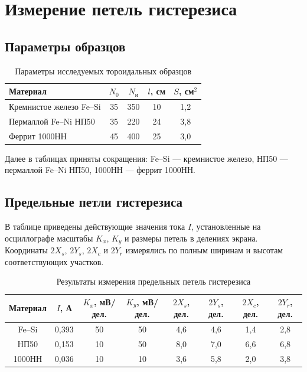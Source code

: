 \documentclass[12pt,a4paper]{article}
\begin{document}
\section{Измерение петель гистерезиса}

\subsection{Параметры образцов}
\begin{table}[H]
  \centering
  \caption{Параметры исследуемых тороидальных образцов}
  \label{tab:samples}
  \begin{tabular}{l c c c c}
    \toprule
    Материал & $N_0$ & $N_{\text{и}}$ & $l$, см & $S$, см$^2$ \\
    \midrule
    Кремнистое железо Fe--Si & 35 & 350 & 10 & 1,2 \\
    Пермаллой Fe--Ni НП50 & 35 & 220 & 24 & 3,8 \\
    Феррит 1000НН & 45 & 400 & 25 & 3,0 \\
    \bottomrule
  \end{tabular}
\end{table}

Далее в таблицах приняты сокращения: Fe--Si --- кремнистое железо,
НП50 --- пермаллой Fe--Ni НП50, 1000НН --- феррит 1000НН.

\subsection{Предельные петли гистерезиса}

В таблице приведены действующие значения тока $I$,
установленные на осциллографе масштабы $K_x$, $K_y$
и размеры петель в делениях экрана. Координаты
$2X_s$, $2Y_s$, $2X_c$ и $2Y_r$ измерялись по полным
ширинам и высотам соответствующих участков.

\begin{table}[H]
    \centering
    \caption{Результаты измерения предельных петель гистерезиса}
    \label{tab:hysteresis}
    \scriptsize
    \setlength{\tabcolsep}{3.1pt}
    \begin{tabular}{|c|c|c|c|c|c|c|c|}
        \hline
        Материал &
        $I$, А &
        $K_x$, мВ/дел. &
        $K_y$, мВ/дел. &
        $2X_s$, дел. &
        $2Y_s$, дел. &
        $2X_c$, дел. &
        $2Y_r$, дел. \\
        \hline
        Fe--Si & 0,393 & 50 & 50 & 4,6 & 4,6 & 1,4 & 2,8 \\
        \hline
        НП50 & 0,153 & 10 & 50 & 8,0 & 7,0 & 6,6 & 6,8 \\
        \hline
        1000НН & 0,036 & 10 & 10 & 3,6 & 5,8 & 2,0 & 3,8 \\
        \hline
    \end{tabular}
\end{table}
\end{document}
